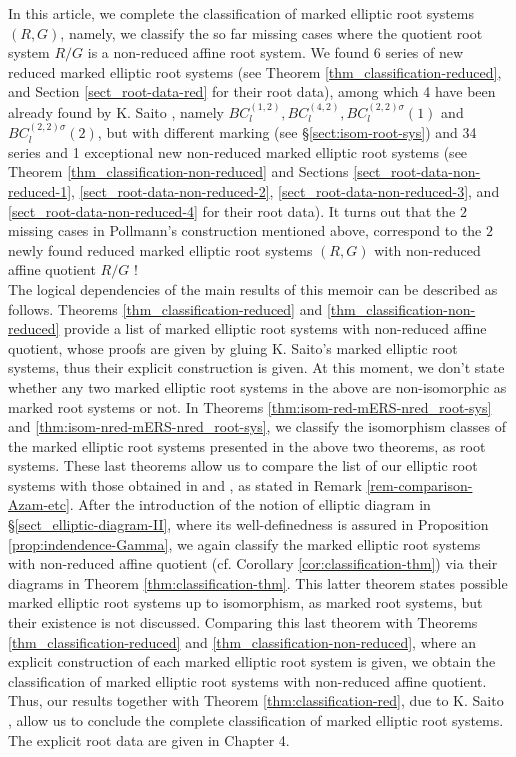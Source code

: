 \documentclass[11pt]{amsart}
\begin{document}

In this article, we complete the classification of marked elliptic root systems $(R,G)$, namely, we classify the so far missing cases where the quotient root system $R/G$ is a non-reduced affine root system. We found 6 series of new reduced marked elliptic root systems (see Theorem \ref{thm_classification-reduced}, and Section \ref{sect_root-data-red} for their root data), among which 4  have been already found by K. Saito \cite{Saito1985}, namely $BC_l^{(1,2)}, BC_l^{(4,2)}, BC_l^{(2,2)\sigma}(1)$ and $BC_l^{(2,2)\sigma}(2)$, but with different marking (see \S \ref{sect:isom-root-sys}) and 34 series and 1 exceptional new non-reduced marked elliptic root systems (see Theorem \ref{thm_classification-non-reduced} and Sections \ref{sect_root-data-non-reduced-1}, \ref{sect_root-data-non-reduced-2}, \ref{sect_root-data-non-reduced-3}, and \ref{sect_root-data-non-reduced-4} for their root data).  It turns out that the $2$ missing cases in Pollmann's construction mentioned above, correspond to the $2$ 
newly found reduced marked elliptic root systems $(R,G)$ with non-reduced affine quotient $R/G$ ! \\


The logical dependencies of the main results of this memoir can be described as follows.
Theorems \ref{thm_classification-reduced}  and \ref{thm_classification-non-reduced} provide a list of marked elliptic root systems with non-reduced affine quotient, whose proofs are given by gluing K. Saito's marked elliptic root systems, thus their explicit construction is given. At this moment, we don't state whether any two marked elliptic root systems in the above are non-isomorphic as marked root systems or not. In Theorems \ref{thm:isom-red-mERS-nred_root-sys} and \ref{thm:isom-nred-mERS-nred_root-sys}, we classify the isomorphism classes of the marked elliptic root systems presented in the above two theorems, as root systems. 
These last theorems allow us to compare the list of our elliptic root systems with those obtained in \cite{Azam2002} and \cite{AzamKhaliliYousofzadeh2005}, as stated in Remark \ref{rem-comparison-Azam-etc}.
After the introduction of the notion of elliptic diagram in \S \ref{sect_elliptic-diagram-II}, where its well-definedness is assured in Proposition \ref{prop:indendence-Gamma}, we again classify the marked elliptic root systems with non-reduced affine quotient (cf. Corollary \ref{cor:classification-thm}) via their diagrams in Theorem \ref{thm:classification-thm}. This latter theorem states possible marked elliptic root systems up to isomorphism, as marked root systems, but their existence is not discussed. 
Comparing this last theorem with Theorems \ref{thm_classification-reduced}  and \ref{thm_classification-non-reduced}, where an explicit construction of each marked elliptic root system is given, we obtain the classification of marked elliptic root systems with non-reduced affine quotient. Thus, our results together with Theorem \ref{thm:classification-red}, due to K. Saito \cite{Saito1985}, 
allow us to conclude the complete classification of marked elliptic root systems. The explicit root data are given in Chapter 4. \\
\end{document}
